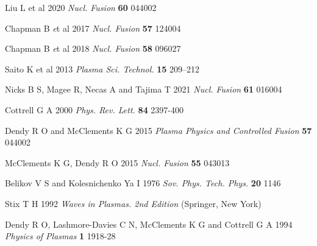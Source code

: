 \documentclass[12pt]{iopart}
\begin{document}
\begin{thebibliography}{9}
Liu L et al 2020  \textit{Nucl. Fusion} \textbf{60} 044002

Chapman B {\textit et al} 2017 \textit{Nucl. Fusion} \textbf{57} 124004

Chapman B {\textit et al} 2018 \textit{Nucl. Fusion} \textbf{58} 096027

Saito K et al 2013 \textit{Plasma Sci. Technol.} \textbf{15} 209–212

Nicks B S, Magee R, Necas A and Tajima T 2021 \textit{Nucl. Fusion} \textbf{61} 016004

Cottrell G A 2000 \textit{Phys. Rev. Lett.} \textbf{84} 2397-400

Dendy R O and McClements K G 2015 \textit{Plasma Physics and Controlled Fusion} \textbf{57} 044002

McClements K G, Dendy R O 2015 \textit{Nucl. Fusion} \textbf{55} 043013

Belikov V S and Kolesnichenko Ya I 1976 \textit{Sov. Phys. Tech. Phys.} \textbf{20} 1146

Stix T H 1992 \textit{Waves in Plasmas. 2nd Edition} (Springer, New York)

Dendy R O, Lashmore-Davies C N, McClements K G and Cottrell G A 1994 \textit{Physics of Plasmas} \textbf{1} 1918-28


\end{thebibliography}
\end{document}
